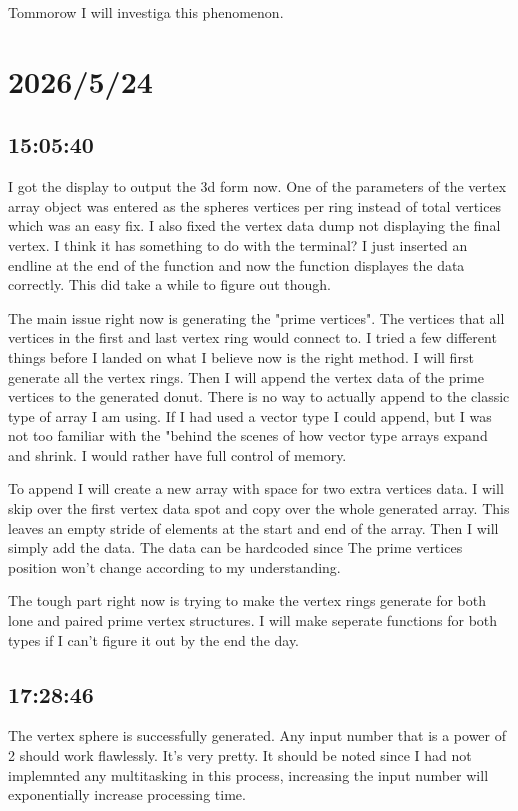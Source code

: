 \documentclass{article}
\begin{document}
Tommorow I will investiga this phenomenon.

\section*{2026/5/24}
\subsection*{15:05:40}
I got the display to output the 3d form now. One of the parameters of the vertex array object was 
entered as the spheres vertices per ring instead of total vertices which was an easy fix. I also fixed
the vertex data dump not displaying the final vertex. I think it has something to do with the terminal?
I just inserted an endline at the end of the function and now the function displayes the data correctly.
This did take a while to figure out though.

The main issue right now is generating the "prime vertices". The vertices that all vertices in the 
first and last vertex ring would connect to. I tried a few different things before I landed on what 
I believe now is the right method. I will first generate all the vertex rings. Then I will append
the vertex data of the prime vertices to the generated donut. There is no way to actually append to
the classic type of array I am using. If I had used a vector type I could append, but I was not too
familiar with the "behind the scenes of how vector type arrays expand and shrink. I would rather have
full control of memory. 

To append I will create a new array with space for two extra vertices data. I will skip over the first
vertex data spot and copy over the whole generated array. This leaves an empty stride of elements at the
start and end of the array. Then I will simply add the data. The data can be hardcoded since The prime 
vertices position won't change according to my understanding.

The tough part right now is trying to make the vertex rings generate for both lone and paired prime
vertex structures. I will make seperate functions for both types if I can't figure it out by the end 
the day.

\subsection*{17:28:46}
The vertex sphere is successfully generated. Any input number that is a power of 2 should work flawlessly.
It's very pretty. It should be noted since I had not implemnted any multitasking in this process, increasing
the input number will exponentially increase processing time.
\end{document}
